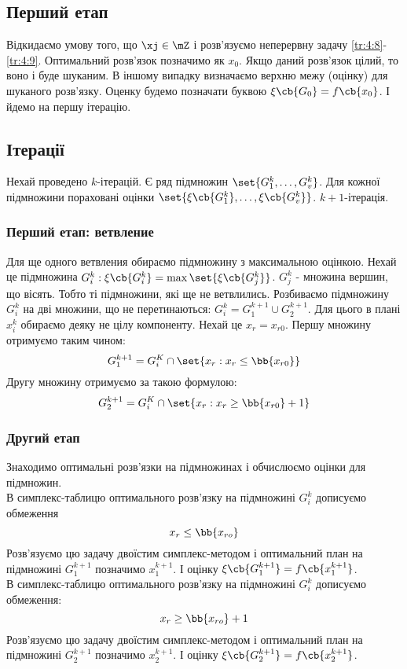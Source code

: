 \subsection*{Перший етап}
Відкидаємо умову того, що $\xj\in\mZ$ і розв’язуємо неперервну задачу \eqref{tr:4:8}-\eqref{tr:4:9}. Оптимальний розв’язок позначимо як $x_0$. Якщо даний розв’язок цілий, то воно і буде шуканим. В іншому випадку визначаємо верхню межу (оцінку) для шуканого розв’язку. Оценку будемо позначати буквою $\xi\cb{G_0}=f\cb{x_0}$. І йдемо на першу ітерацію.
\subsection*{Ітерації}
Нехай проведено $k$-ітерацій. Є ряд підмножин $\set{G_1^k,\ldots,G_v^k}$. Для кожної підмножини пораховані оцінки $\set{\xi\cb{G_1^k},\ldots,\xi\cb{G_v^k}}$. $k+1$-ітерація.
\subsubsection{Перший етап: ветвление}
Для ще одного ветвления обираємо підмножину з максимальною оцінкою. Нехай це підмножина $G_i^k:\xi\cb{G_i^k}=\max\set{\xi\cb{G_j^k}}$. $G_j^k$ - множина вершин, що вісять. Тобто ті підмножини, які ще не ветвлились. Розбиваємо підмножину $G_i^k$ на дві множини, що не перетинаються: $G_i^k = G_1^{k+1}\cup G_2^{k+1}$. Для цього в плані $x_i^k$ обираємо деяку не цілу компоненту. Нехай це $x_r = x_{r0}$. Першу множину отримуємо таким чином:
\begin{equation}
G_1^{k+1} = G_i^K \cap \set{x_r:x_r\leq\bb{x_{r0}}}
\end{equation}
Другу множину отримуємо за такою формулою:
\begin{equation}
G_2^{k+1} = G_i^K \cap \set{x_r:x_r\geq\bb{x_{r0}}+1}
\end{equation}
\subsubsection{Другий етап}
Знаходимо оптимальні розв’язки на підмножинах і обчислюємо оцінки для підмножин.\\
В симплекс-таблицю оптимального розв’язку на підмножині $G_i^k$ дописуємо обмеження
\begin{equation}
x_r \leq \bb{x_{ro}}
\end{equation}
Розв’язуємо цю задачу двоїстим симплекс-методом і оптимальний план на підмножині $G_1^{k+1}$ позначимо $x_1^{k+1}$. І оцінку $\xi\cb{G_1^{k+1}} = f\cb{x_1^{k+1}}$.\\
В симплекс-таблицю оптимального розв’язку на підмножині $G_i^k$ дописуємо обмеження:
\begin{equation}
x_r \geq \bb{x_{ro}} +1
\end{equation}
Розв’язуємо цю задачу двоїстим симплекс-методом і оптимальний план на підмножині $G_2^{k+1}$ позначимо $x_2^{k+1}$. І оцінку $\xi\cb{G_2^{k+1}} = f\cb{x_2^{k+1}}$.
